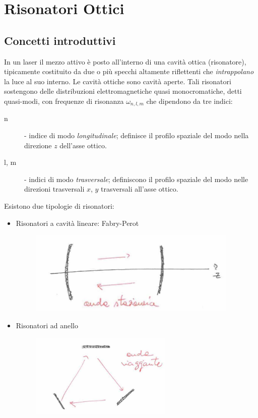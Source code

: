 \documentclass{book}
\theoremstyle{remark}
\begin{document}
\chapter{Risonatori Ottici}
\section{Concetti introduttivi}
In un laser il mezzo attivo è posto all'interno di una cavità ottica (risonatore), tipicamente costituito da due o più specchi altamente riflettenti che \textit{intrappolano} la luce al suo interno.
Le cavità ottiche sono cavità aperte. Tali risonatori sostengono delle distribuzioni elettromagnetiche quasi monocromatiche, detti quasi-modi, con frequenze di risonanza $\omega_{n,l,m}$ che dipendono da tre indici:
\begin{description}
\item [n] - indice di modo \textit{longitudinale}; definisce il profilo spaziale del modo nella direzione $z$ dell'asse ottico.
\item [l, m] - indici di modo \textit{trasversale}; definiscono il profilo spaziale del modo nelle direzioni trasversali $x$, $y$ trasversali all'asse ottico.
\end{description}
Esistono due tipologie di risonatori:
\begin{itemize}
\item Risonatori a cavità lineare: Fabry-Perot
\begin{figure}[H]
\centering
\includegraphics[height=4cm]{images/8}
\end{figure}
\item Risonatori ad anello
\begin{figure}[H]
\centering
\includegraphics[height=4cm]{images/9}
\end{figure}
\end{itemize}
\end{document}
